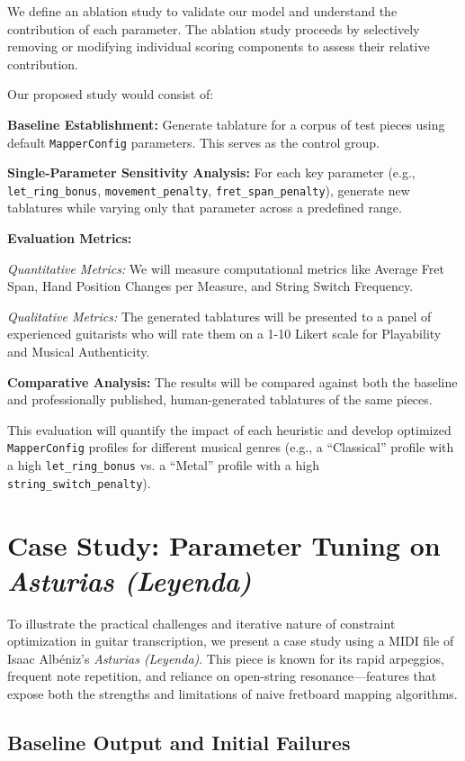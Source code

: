 \documentclass[conference]{IEEEtran}
\begin{document}
We define an ablation study to validate our model and understand the contribution of each parameter. The ablation study proceeds by selectively removing or modifying individual scoring components to assess their relative contribution.


Our proposed study would consist of:

\textbf{Baseline Establishment:} Generate tablature for a corpus of test pieces using default \texttt{MapperConfig} parameters. This serves as the control group.

\textbf{Single-Parameter Sensitivity Analysis:} For each key parameter (e.g., \texttt{let\_ring\_bonus}, \texttt{movement\_penalty}, \texttt{fret\_span\_penalty}), generate new tablatures while varying only that parameter across a predefined range.

\textbf{Evaluation Metrics:}

\textit{Quantitative Metrics:} We will measure computational metrics like Average Fret Span, Hand Position Changes per Measure, and String Switch Frequency.

\textit{Qualitative Metrics:} The generated tablatures will be presented to a panel of experienced guitarists who will rate them on a 1-10 Likert scale for Playability and Musical Authenticity.

\textbf{Comparative Analysis:} The results will be compared against both the baseline and professionally published, human-generated tablatures of the same pieces.

This evaluation will quantify the impact of each heuristic and develop optimized \texttt{MapperConfig} profiles for different musical genres (e.g., a ``Classical'' profile with a high \texttt{let\_ring\_bonus} vs. a ``Metal'' profile with a high \texttt{string\_switch\_penalty}).

\section{Case Study: Parameter Tuning on \emph{Asturias (Leyenda)}}

To illustrate the practical challenges and iterative nature of constraint optimization in guitar transcription, we present a case study using a MIDI file of Isaac Albéniz’s \emph{Asturias (Leyenda)}. This piece is known for its rapid arpeggios, frequent note repetition, and reliance on open-string resonance—features that expose both the strengths and limitations of naive fretboard mapping algorithms.

\subsection{Baseline Output and Initial Failures}
\end{document}
